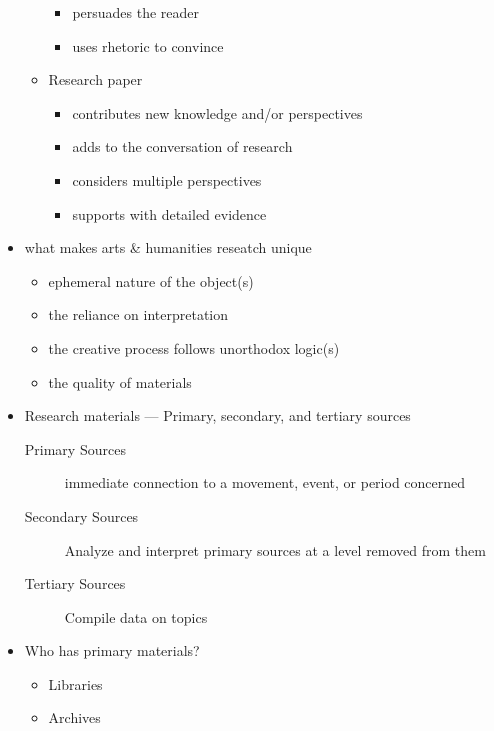 \documentclass[12pt]{article}
\begin{document}
\begin{itemize}
\begin{itemize}
\begin{itemize}
                        \item persuades the reader
                        \item uses rhetoric to convince
                    \end{itemize}
                    \item Research paper
                    \begin{itemize}
                        \item contributes new knowledge and/or perspectives
                        \item adds to the conversation of research
                        \item considers multiple perspectives
                        \item supports with detailed evidence
                    \end{itemize}
                \end{itemize}
                \item what makes arts \& humanities reseatch unique 
                \begin{itemize}
                    \item ephemeral nature of the object(s)
                    \item the reliance on interpretation
                    \item the creative process follows unorthodox logic(s)
                    \item the quality of materials
                \end{itemize}
                \item Research materials --- Primary, secondary, and tertiary sources
                \begin{description}
                    \item[Primary Sources] immediate connection to a movement, event, or period concerned
                    \item[Secondary Sources] Analyze and interpret primary sources at a level removed from them
                    \item[Tertiary Sources] Compile data on topics  
                \end{description}
                \item Who has primary materials?
                \begin{itemize}
                    \item Libraries
                    \item Archives

\end{itemize}
\end{itemize}
\end{document}
